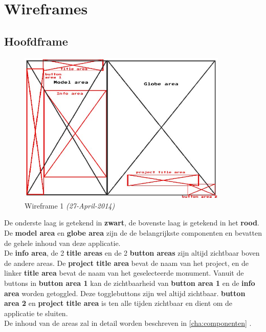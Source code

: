 \chapter{Wireframes} \label{cha:wireframes}

\section{Hoofdframe} \label{sec:hoofdframe}
\begin{figure}[h]
  \includegraphics[width=100mm]{figs/wireframe1.jpg}
  \caption{Wireframe 1 \textit{(27-April-2014)}}
  \label{fig:wireframe1}
\end{figure}

De onderste laag is getekend in \textbf{zwart}, de bovenste laag is getekend in het \textbf{{\color{red}rood}}.\\
De \textbf{model area} en \textbf{globe area} zijn de de belangrijkste componenten en bevatten de gehele inhoud van deze applicatie.\\
De \textbf{{\color{red}info area}}, de 2 \textbf{{\color{red}title areas}} en de 2 \textbf{{\color{red}button areas}} zijn altijd zichtbaar boven de andere areas. De \textbf{{\color{red}project title area}} bevat de naam van het project, \projectname  en de linker \textbf{{\color{red}title area}} bevat de naam van het geselecteerde monument. Vanuit de buttons in \textbf{{\color{red}button area 1}} kan de zichtbaarheid van \textbf{{\color{red}button area 1}} en de \textbf{{\color{red}info area}} worden getoggled. Deze togglebuttons zijn wel altijd zichtbaar. \textbf{{\color{red}button area 2}} en \textbf{{\color{red}project title area}} is ten alle tijden zichtbaar en dient om de applicatie te sluiten.\\
De inhoud van de areas zal in detail worden beschreven in \cref{cha:componenten} .
\newpage
